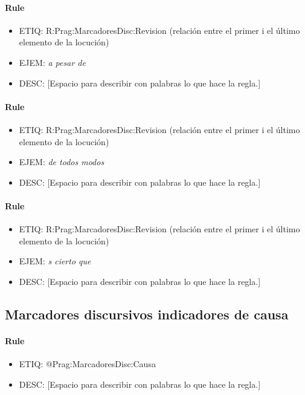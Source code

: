 \documentclass[11pt]{report}
\begin{document}
\paragraph*{Rule}
\begin{itemize}
\item ETIQ: R:Prag:MarcadoresDisc:Revision (relación entre el primer i el último elemento de la locución)
\item EJEM: \emph{a pesar de}
\item DESC: [Espacio para describir con palabras lo que hace la regla.]
\end{itemize}

\paragraph*{Rule}
\begin{itemize}
\item ETIQ: R:Prag:MarcadoresDisc:Revision (relación entre el primer i el último elemento de la locución)
\item EJEM: \emph{de todos modos}
\item DESC: [Espacio para describir con palabras lo que hace la regla.]
\end{itemize}

\paragraph*{Rule}
\begin{itemize}
\item ETIQ: R:Prag:MarcadoresDisc:Revision (relación entre el primer i el último elemento de la locución)
\item EJEM: \emph{s cierto que}
\item DESC: [Espacio para describir con palabras lo que hace la regla.]
\end{itemize}

\subsection{Marcadores discursivos indicadores de causa}
\paragraph*{Rule}
\begin{itemize}
\item ETIQ: @Prag:MarcadoresDisc:Causa
\item DESC: [Espacio para describir con palabras lo que hace la regla.]
\end{itemize}
\end{document}
